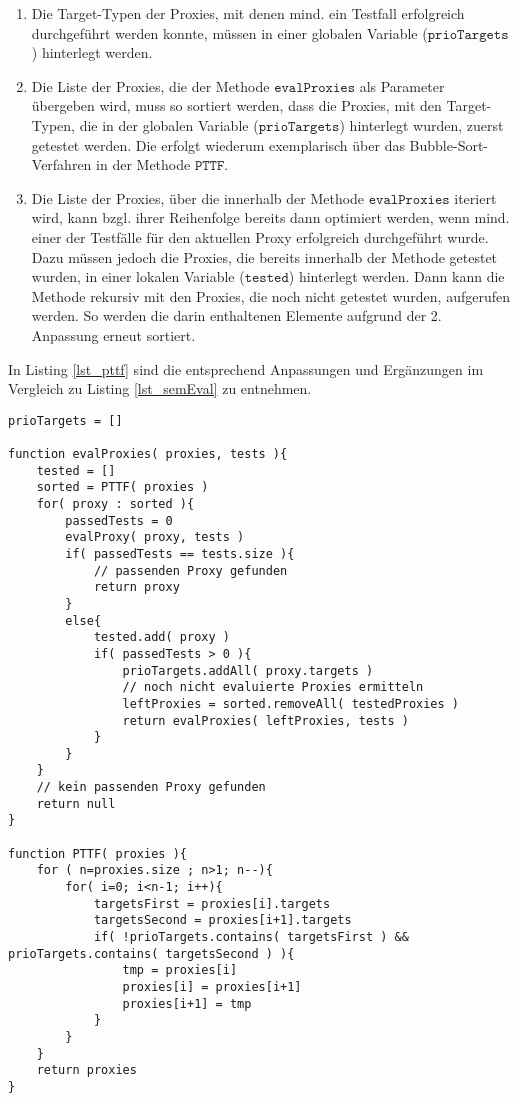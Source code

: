\begin{enumerate}
\item Die Target-Typen der Proxies, mit denen mind. ein Testfall erfolgreich durchgeführt werden konnte, müssen in einer globalen Variable ($\texttt{prioTargets}$) hinterlegt werden.
\item Die Liste der Proxies, die der Methode $\texttt{evalProxies}$ als Parameter übergeben wird, muss so sortiert werden, dass die Proxies, mit den Target-Typen, die in der globalen Variable ($\texttt{prioTargets}$) hinterlegt wurden, zuerst getestet werden. Die erfolgt wiederum exemplarisch über das Bubble-Sort-Verfahren in der Methode $\texttt{PTTF}$.
\item Die Liste der Proxies, über die innerhalb der Methode $\texttt{evalProxies}$ iteriert wird, kann bzgl. ihrer Reihenfolge bereits dann optimiert werden, wenn mind. einer der Testfälle für den aktuellen Proxy erfolgreich durchgeführt wurde. Dazu müssen jedoch die Proxies, die bereits innerhalb der Methode getestet wurden, in einer lokalen Variable ($\texttt{tested}$) hinterlegt werden. Dann kann die Methode rekursiv mit den Proxies, die noch nicht getestet wurden, aufgerufen werden. So werden die darin enthaltenen Elemente aufgrund der 2. Anpassung erneut sortiert.
\end{enumerate}  
In Listing \ref{lst_pttf} sind die entsprechend Anpassungen und Ergänzungen im Vergleich zu Listing \ref{lst_semEval} zu entnehmen.
\begin{lstlisting}[style = pseudo, caption = Semantische Evaluation mit Heuristik PTTF, captionpos = b, label = lst_pttf]
prioTargets = []

function evalProxies( proxies, tests ){
	tested = []
	sorted = PTTF( proxies )
	for( proxy : sorted ){
		passedTests = 0
		evalProxy( proxy, tests )
		if( passedTests == tests.size ){
			// passenden Proxy gefunden
			return proxy
		}
		else{
			tested.add( proxy )
			if( passedTests > 0 ){
				prioTargets.addAll( proxy.targets )
				// noch nicht evaluierte Proxies ermitteln
				leftProxies = sorted.removeAll( testedProxies )
				return evalProxies( leftProxies, tests )
			}
		}
	}
	// kein passenden Proxy gefunden
	return null
}

function PTTF( proxies ){
	for	( n=proxies.size ; n>1; n--){
		for( i=0; i<n-1; i++){
			targetsFirst = proxies[i].targets
			targetsSecond = proxies[i+1].targets			
			if( !prioTargets.contains( targetsFirst ) && prioTargets.contains( targetsSecond ) ){
				tmp = proxies[i]
				proxies[i] = proxies[i+1]
				proxies[i+1] = tmp
			}
		}
	}
	return proxies	
}
\end{lstlisting}

